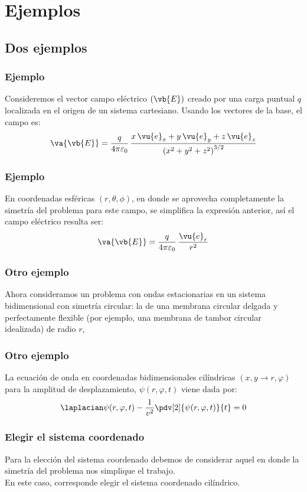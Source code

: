 \section{Ejemplos}
\subsection{Dos ejemplos}
\begin{frame}
\frametitle{Ejemplo}
Consideremos el vector campo eléctrico $(\vb{E})$ creado por una carga puntual $q$ localizada en el origen de un sistema cartesiano. Usando los vectores de la base, el campo es:
\begin{align*}
\va{\vb{E}} = \dfrac{q}{4 \pi \varepsilon_{0}} \, \dfrac{x \, \vu{e}_{x} + y \, \vu{e}_{y} + z \, \vu{e}_{z}}{\left( x^{2} + y^{2} + z^{2} \right)^{3/2}}
\end{align*}
\end{frame}
\begin{frame}
\frametitle{Ejemplo}
En coordenadas esféricas $(r, \theta, \phi)$, en donde se aprovecha completamente la simetría del problema para este campo, se simplifica la expresión anterior, así el campo eléctrico resulta ser:
\begin{align*}
\va{\vb{E}} = \dfrac{q}{4 \pi \varepsilon_{0}} \, \dfrac{\vu{e}_{r}}{r^{2}}
\end{align*}
\end{frame}
\begin{frame}
\frametitle{Otro ejemplo}
Ahora consideramos un problema con ondas estacionarias en un sistema bidimensional con simetría circular: la de una membrana circular delgada y perfectamente flexible (por ejemplo, una membrana de tambor circular idealizada) de radio $r$,
\end{frame}
\begin{frame}
\frametitle{Otro ejemplo}
La ecuación de onda en coordenadas bidimensionales cilíndricas $(x , y \rightarrow r, \varphi)$ para la amplitud de desplazamiento, $\psi (r, \varphi, t)$ viene dada por:
\begin{align*}
\laplacian \psi (r, \varphi, t) - \dfrac{1}{v^{2}} \pdv[2]{\psi (r, \varphi, t)}{t} = 0
\end{align*}
\end{frame}
\begin{frame}
\frametitle{Elegir el sistema coordenado}
Para la elección del sistema coordenado debemos de considerar aquel en donde la simetría del problema nos simplique el trabajo.
\\
\bigskip
\pause
En este caso, corresponde elegir el sistema coordenado cilíndrico.
\end{frame}
